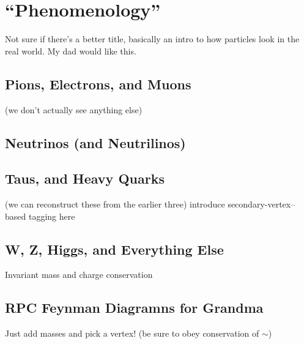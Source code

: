 \section{``Phenomenology''}
\label{sec:pheno}
Not sure if there's a better title, basically an intro to how particles
look in the real world. My dad would like this.
\subsection{Pions, Electrons, and Muons}
(we don't actually see anything else)
\subsection{Neutrinos (and Neutrilinos)}
\subsection{Taus, and Heavy Quarks}
(we can reconstruct these from the earlier three)
introduce secondary-vertex--based tagging here
\subsection{W, Z, Higgs, and Everything Else}
Invariant mass and charge conservation
\subsection{RPC Feynman Diagramns for Grandma}
Just add masses and pick a vertex! (be sure to obey conservation of $\sim$)
